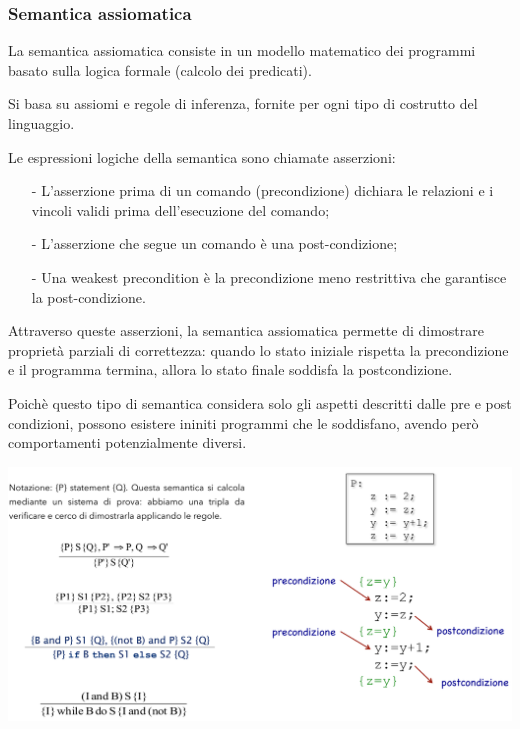 \documentclass[a4paper, 10pt]{report}
\begin{document}
\subsubsection*{Semantica assiomatica}
La semantica assiomatica consiste in un modello matematico  dei programmi basato sulla logica formale (calcolo dei predicati).

\noindent Si basa su assiomi  e regole  di  inferenza,  fornite  per  ogni  tipo  di  costrutto  del linguaggio. 

\noindent Le  espressioni  logiche  della  semantica  sono chiamate asserzioni:  
\begin{itemize}
\item[-] L’asserzione   prima   di   un   comando   (precondizione) dichiara   le   relazioni   e   i   vincoli   validi   prima dell’esecuzione del comando;
\item[-] L'asserzione che segue un comando è una post-condizione;
\item[-] Una weakest precondition è la precondizione meno restrittiva che garantisce la post-condizione.
\end{itemize}

Attraverso   queste   asserzioni,   la   semantica   assiomatica permette  di  dimostrare  proprietà  parziali  di  correttezza: quando   lo   stato   iniziale   rispetta   la   precondizione   e   il programma   termina,   allora   lo   stato   finale   soddisfa   la postcondizione.  

Poichè questo tipo di semantica considera solo gli aspetti descritti dalle pre e post condizioni, possono esistere ininiti programmi che le soddisfano, avendo però comportamenti potenzialmente diversi.

\begin{center}
\includegraphics[scale=0.75]{immagine02.pdf}
\end{center}
\end{document}
